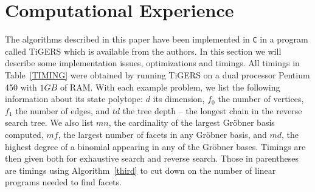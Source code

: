 \documentclass[11pt]{article}
\begin{document}
\section{Computational Experience}
The algorithms described in this paper have been implemented in {\tt C}
in a program called TiGERS which is available from the authors. 
In this section we will describe some implementation issues, 
optimizations and timings.
All timings in Table~\ref{TIMING} were obtained by running TiGERS on
a dual processor Pentium 450 with $1GB$ of RAM. With each example
problem, we list the following information about its state polytope:
$d$ its dimension, $f_0$ the number of vertices, $f_1$ the number of
edges, and $td$ the tree depth -- the longest chain in the reverse
search tree. We also list $mn$, the cardinality of the largest
Gr\"obner basis computed, $mf$, the largest number of facets in any
Gr\"obner basis, and $md$, the highest degree of a binomial
appearing in any of the Gr\"obner bases. 
Timings are then given both for exhaustive search and reverse
search. Those in parentheses are timings using Algorithm~\ref{third}
to cut down on the number of linear programs needed to find facets.
\end{document}
